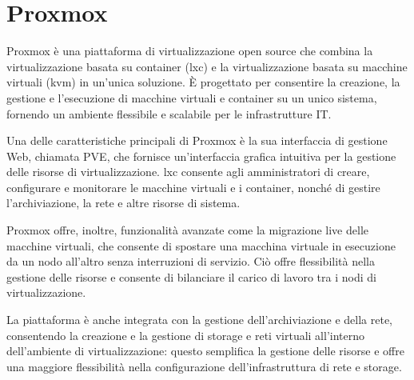 \section{Proxmox}

Proxmox è una piattaforma di virtualizzazione open source che combina la virtualizzazione basata su container (\acrshort{lxc}) e la virtualizzazione basata su macchine virtuali (\acrfull{kvm}) in un'unica soluzione. È progettato per consentire la creazione, la gestione e l'esecuzione di macchine virtuali e container su un unico sistema, fornendo un ambiente flessibile e scalabile per le infrastrutture IT.

Una delle caratteristiche principali di Proxmox è la sua interfaccia di gestione Web, chiamata \acrfull{PVE}, che fornisce un'interfaccia grafica intuitiva per la gestione delle risorse di virtualizzazione. \acrshort{lxc} consente agli amministratori di creare, configurare e monitorare le macchine virtuali e i container, nonché di gestire l'archiviazione, la rete e altre risorse di sistema.

Proxmox offre, inoltre, funzionalità avanzate come la migrazione live delle macchine virtuali, che consente di spostare una macchina virtuale in esecuzione da un nodo all'altro senza interruzioni di servizio. Ciò offre flessibilità nella gestione delle risorse e consente di bilanciare il carico di lavoro tra i nodi di virtualizzazione.

La piattaforma è anche integrata con la gestione dell'archiviazione e della rete, consentendo la creazione e la gestione di storage e reti virtuali all'interno dell'ambiente di virtualizzazione: questo semplifica la gestione delle risorse e offre una maggiore flessibilità nella configurazione dell'infrastruttura di rete e storage.

